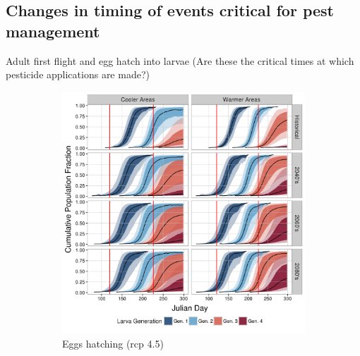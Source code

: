\documentclass[12pt]{article}
\theoremstyle{plain}
\theoremstyle{definition}
\theoremstyle{definition}
\begin{document}
\subsection{Changes in timing of events critical for pest management}
Adult first flight and egg hatch into larvae (Are these the critical times at which pesticide applications are made?) 

\begin{figure}[h!]
    \centering
    \begin{subfigure}[b]{0.43\textwidth}
        \includegraphics[width=\textwidth]{figures/plot_eggHatch_rcp45}
        \caption{Eggs hatching (rcp 4.5)}
        \label{fig:Eggs_Hatch_45)}
    \end{subfigure}
    ~ %
    \begin{subfigure}[b]{0.43\textwidth}

\end{subfigure}
\end{figure}
\end{document}
